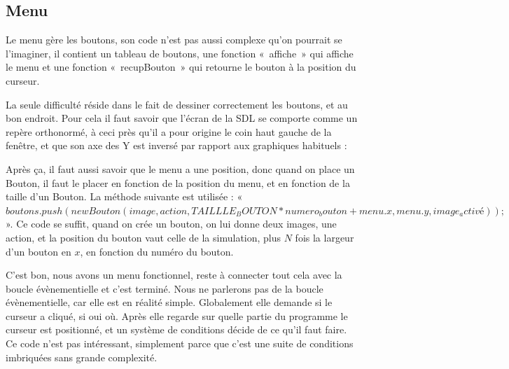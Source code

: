 \subsection{Menu}
	Le menu gère les boutons, son code n'est pas aussi complexe qu'on pourrait se l'imaginer, il contient un tableau de boutons, une fonction «~affiche~» qui affiche le menu et une fonction «~recupBouton~» qui retourne le bouton à la position du curseur.
	
	La seule difficulté réside dans le fait de dessiner correctement les boutons, et au bon endroit. Pour cela il faut savoir que l'écran de la SDL se comporte comme un repère orthonormé, à ceci près qu'il a pour origine le coin haut gauche de la fenêtre, et que son axe des Y est inversé par rapport aux graphiques habituels : 
	
	Après ça, il faut aussi savoir que le menu a une position, donc quand on place un Bouton, il faut le placer en fonction de la position du menu, et en fonction de la taille d'un Bouton. La méthode suivante est utilisée : 
	« $boutons.push(new Bouton (image,action, TAILLLE_BOUTON * numero_bouton + menu.x , menu.y,image_activé));$ ». Ce code se suffit, quand on crée un bouton, on lui donne deux images, une action, et la position du bouton vaut celle de la simulation, plus $N$ fois la largeur d'un bouton en $x$, en fonction du numéro du bouton.
	
	C'est bon, nous avons un menu fonctionnel, reste à connecter tout cela avec la boucle évènementielle et c'est terminé. Nous ne parlerons pas de la boucle évènementielle, car elle est en réalité simple. Globalement elle demande si le curseur a cliqué, si oui où. Après elle regarde sur quelle partie du programme le curseur est positionné, et un système de conditions décide de ce qu'il faut faire. Ce code n'est pas intéressant, simplement parce que c'est une suite de conditions imbriquées sans grande complexité.

